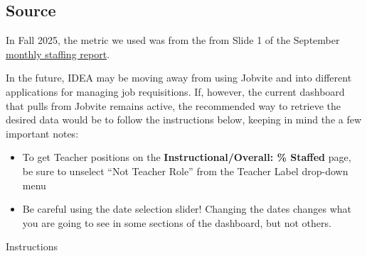 \documentclass[
  letterpaper,
  DIV=11,
  numbers=noendperiod]{scrreprt}
\begin{document}
\subsection{Source}\label{source-4}

In Fall 2025, the metric we used was from the from Slide 1 of the
September
\href{https://teams.microsoft.com/l/message/19:meeting_YjY1NDZkYTUtYTkwNi00ZTY4LWI5NWYtYmJlY2UxMDczNmFl@thread.v2/1757093022018?context=\%7B\%22contextType\%22\%3A\%22chat\%22\%7D}{monthly
staffing report}.

In the future, IDEA may be moving away from using Jobvite and into
different applications for managing job requisitions. If, however, the
current dashboard that pulls from Jobvite remains active, the
recommended way to retrieve the desired data would be to follow the
instructions below, keeping in mind the a few important notes:

\begin{itemize}
\item
  To get Teacher positions on the \textbf{Instructional/Overall: \%
  Staffed} page, be sure to unselect ``Not Teacher Role'' from the
  Teacher Label drop-down menu
\item
  Be careful using the date selection slider! Changing the dates changes
  what you are going to see in some sections of the dashboard, but not
  others.
\end{itemize}

Instructions
\end{document}
